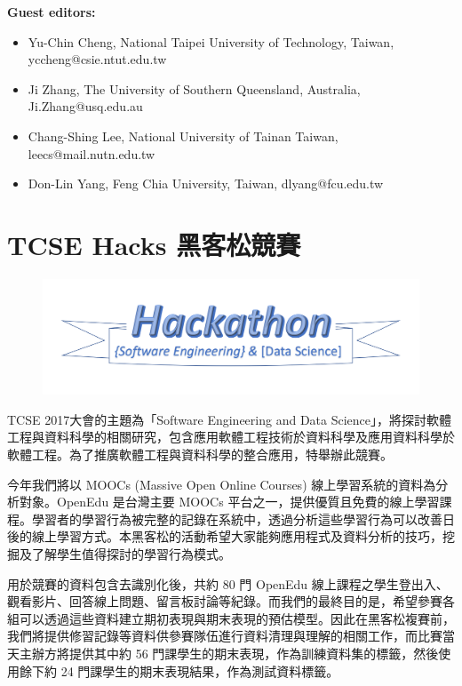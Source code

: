 \documentclass[12pt,oneside,a4paper]{book}
\newcommand{\mIndent}{\hspace{.5cm}}
\begin{document}
\textbf{Guest editors:}
\begin{itemize}
\item Yu-Chin Cheng, National Taipei University of Technology, Taiwan, yccheng@csie.ntut.edu.tw
\item Ji Zhang, The University of Southern Queensland, Australia, Ji.Zhang@usq.edu.au
\item Chang-Shing Lee, National University of Tainan
Taiwan, leecs@mail.nutn.edu.tw
\item Don-Lin Yang, Feng Chia University, Taiwan, dlyang@fcu.edu.tw
\end{itemize}

\chapter*{TCSE Hacks 黑客松競賽}
%

\begin{figure}[h!]
\begin{center}
\includegraphics[width=1\columnwidth]{images/Hackathon_logo1.png}
\end{center}
\end{figure}

TCSE 2017大會的主題為「Software Engineering and Data Science」，將探討軟體工程與資料科學的相關研究，包含應用軟體工程技術於資料科學及應用資料科學於軟體工程。為了推廣軟體工程與資料科學的整合應用，特舉辦此競賽。

\mIndent 今年我們將以 MOOCs (Massive Open Online Courses) 線上學習系統的資料為分析對象。OpenEdu 是台灣主要 MOOCs 平台之一，提供優質且免費的線上學習課程。學習者的學習行為被完整的記錄在系統中，透過分析這些學習行為可以改善日後的線上學習方式。本黑客松的活動希望大家能夠應用程式及資料分析的技巧，挖掘及了解學生值得探討的學習行為模式。

\mIndent 用於競賽的資料包含去識別化後，共約 80 門 OpenEdu 線上課程之學生登出入、觀看影片、回答線上問題、留言板討論等紀錄。而我們的最終目的是，希望參賽各組可以透過這些資料建立期初表現與期末表現的預估模型。因此在黑客松複賽前，我們將提供修習記錄等資料供參賽隊伍進行資料清理與理解的相關工作，而比賽當天主辦方將提供其中約 56 門課學生的期末表現，作為訓練資料集的標籤，然後使用餘下約 24 門課學生的期末表現結果，作為測試資料標籤。
\end{document}
